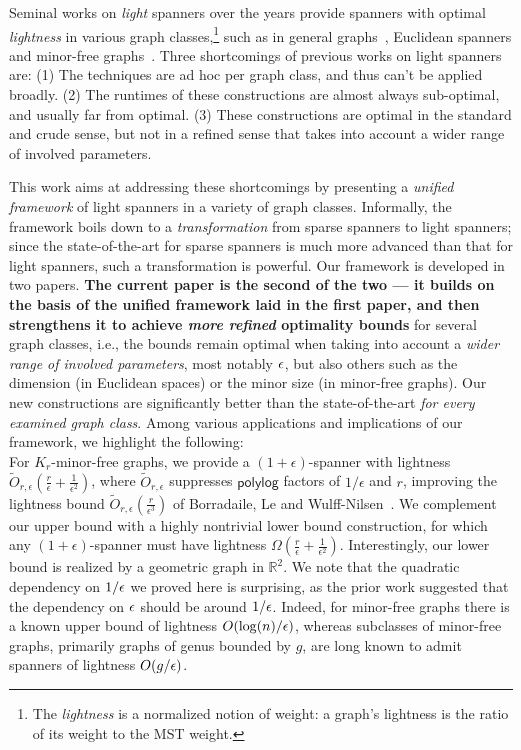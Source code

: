 Seminal works on {\em light} spanners over the years provide spanners with optimal {\em lightness} in various graph classes,\footnote{The {\em lightness} is a normalized notion of weight: a graph's lightness is the ratio of its weight to the MST weight.}  such as in general graphs~\cite{CW16}, Euclidean spanners \cite{das1994fast} and minor-free graphs~\cite{BLW17}.
Three shortcomings of previous works on light spanners are: (1) The techniques are ad hoc per graph class, and thus can't be applied broadly.  (2) The runtimes of these constructions are almost always sub-optimal, and usually far from optimal.
(3) These constructions are optimal in the standard and crude sense, but not in a refined sense that takes into account a wider range of involved parameters.

This work aims at addressing these shortcomings by presenting  a {\em unified framework} of light spanners in a variety of graph classes. Informally, the framework boils down to a {\em transformation} from sparse spanners to light spanners; since the state-of-the-art for sparse spanners is much more advanced than that for light spanners, such a transformation is powerful. 
Our framework is developed in two papers. 
{\bf The current paper is the second of the two ---  it  builds on the basis of the unified framework laid in the first paper, 
and then strengthens it to achieve {\em more refined} optimality bounds} for several graph classes, i.e., the bounds remain optimal when taking into account a \emph{wider range of involved parameters},
most notably $\epsilon$, but also others such as the dimension (in Euclidean spaces) or the minor size (in minor-free graphs). 
Our new constructions are significantly better than the state-of-the-art {\em for every examined graph class}. Among various applications and implications of our framework, we highlight the following:
\noindent
\vspace{5pt}
\\
For $K_r$-minor-free graphs, we provide a  $(1+\epsilon)$-spanner with lightness $\tilde{O}_{r,\epsilon}( \frac{r}{\epsilon} + \frac{1}{\epsilon^2})$,
where $\tilde{O}_{r,\epsilon}$ suppresses $\mathsf{polylog}$ factors of $1/\epsilon$ and $r$,
improving the lightness bound $\tilde{O}_{r,\epsilon}( \frac{r}{\epsilon^3})$ of Borradaile, Le and Wulff-Nilsen~\cite{BLW17}.
We complement our upper bound with a highly nontrivial lower bound construction, for which any $(1+\epsilon)$-spanner must have lightness $\Omega(\frac{r}{\epsilon} + \frac{1}{\epsilon^2})$.
Interestingly, our lower bound is realized by a geometric graph in $\mathbb{R}^2$.
We note that the quadratic dependency on $1/\epsilon$ we proved here is surprising,
as the prior work suggested that the dependency on $\epsilon$ should be around $1/\epsilon$. 
Indeed, for minor-free graphs there is a known upper bound of lightness $O(\log(n)/\epsilon)$,
whereas subclasses of minor-free graphs, primarily graphs of genus bounded by $g$, are long known to admit spanners of lightness $O(g/\epsilon)$.  
